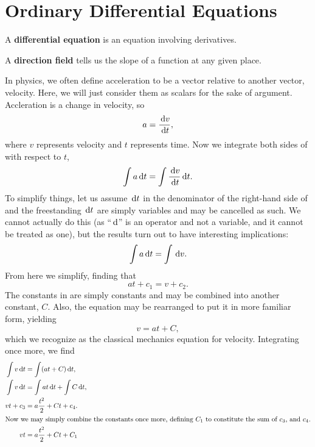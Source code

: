 \chapter{Ordinary Differential Equations}
\begin{defn}
  A \textbf{differential equation} is an equation involving derivatives.
\end{defn}
\begin{defn}
  A \textbf{direction field} tells us the slope of a function at any given place.
\end{defn}
\begin{ex}
    In physics, we often define acceleration to be a vector relative to another vector, velocity.
    Here, we will just consider them as scalars for the sake of argument.
    Accleration is a change in velocity, so
    \begin{equation}
        a = \frac{\,\mathrm{d} v}{\,\mathrm{d} t},
        \label{eq:acceleration}
    \end{equation}
    where $v$ represents velocity and $t$ represents time.
    Now we integrate both sides of  with respect to $t$,
    \begin{equation}
        \int a \,\mathrm{d} t = \int \frac{\,\mathrm{d} v}{\,\mathrm{d} t} \,\mathrm{d} t.
        \label{eq:intaccel}
    \end{equation}
    To simplify things, let us assume $\,\mathrm{d} t$ in the denominator of the right-hand side of  and the freestanding $\,\mathrm{d} t$ are simply variables and may be cancelled as such.
    We cannot actually do this (as ``$\,\mathrm{d}$'' is an operator and not a variable, and it cannot be treated as one), but the results turn out to have interesting implications:
    \begin{equation}
        \int a \,\mathrm{d} t = \int \,\mathrm{d} v.
        \label{eq:naughtint}
    \end{equation}
    From here we simplify, finding that
    \begin{equation}
        at + c_1 = v + c_2.
        \label{eq:almostvelocity}
    \end{equation}
    The constants in  are simply constants and may be combined into another constant, $C$.
    Also, the equation may be rearranged to put it in more familiar form, yielding
    \begin{equation}
        v = at + C,
        \label{eq:velocity}
    \end{equation}
    which we recognize as the classical mechanics equation for velocity.
    Integrating once more, we find
    \begin{align*}
        \int v \,\mathrm{d} t &= \int (at + C) \,\mathrm{d} t, \\
        \int v \,\mathrm{d} t &= \int at \,\mathrm{d} t + \int C \,\mathrm{d} t, \\
        vt + c_3  &= a \frac{t^2}{2} + Ct + c_4. \\
        \intertext{Now we may simply combine the constants once more, defining $C_1$ to constitute the sum of $c_3$, and $c_4$.}
        vt &= a \frac{t^2}{2} + Ct + C_1
    \end{align*}
\end{ex}

